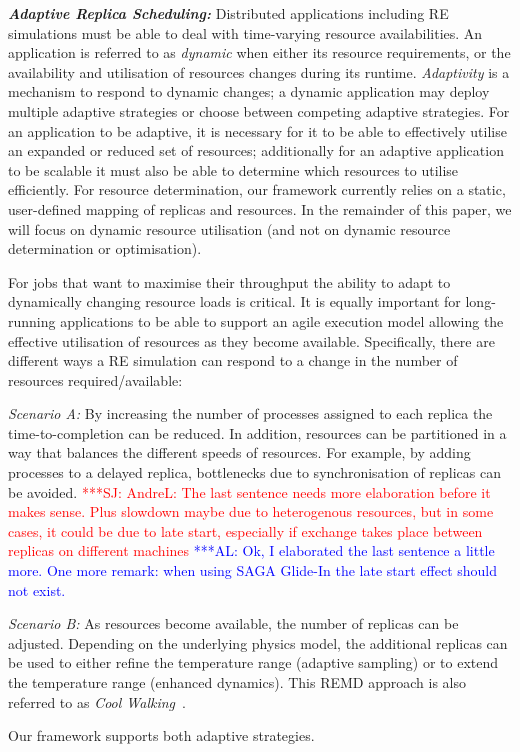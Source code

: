 \documentclass{rspublic}
\newcommand{\alnote}[1]{ {\textcolor{blue} { ***AL: #1 }}}
\newcommand{\jhanote}[1]{ {\textcolor{red} { ***SJ: #1 }}}
\newcommand{\alnote}[1]{}
\newcommand{\jhanote}[1]{}
\begin{document}
{\noindent \it \bf Adaptive Replica Scheduling:} Distributed applications
including RE simulations must be able to deal with time-varying
resource availabilities.  An application is referred to as
\emph{dynamic} when either its resource requirements, 
or the availability and utilisation of resources 
changes during its runtime.  \emph{Adaptivity} is a
mechanism to respond to dynamic
changes; %
a dynamic application may deploy multiple adaptive strategies or
choose between competing adaptive strategies.  For an application to
be adaptive, it is necessary for it to be able to effectively
utilise an expanded or reduced set of resources; additionally for an
adaptive application to be scalable it must also be able to
determine which resources to utilise efficiently.
For resource determination, our framework currently relies on a
static, user-defined mapping of replicas and resources.  In the
remainder of this paper, we will focus on dynamic resource
utilisation (and not on dynamic resource determination or
optimisation).

For jobs that want to maximise their throughput the ability to adapt
to dynamically changing resource loads is critical. 
It is equally important for long-running applications to be
able to support an agile execution model allowing the effective
utilisation of resources as they become available.  Specifically,
there are different ways a RE simulation can respond to a change in
the number of resources required/available:
\begin{compactitem}         
\item {\it Scenario A:} By increasing the number of processes assigned
  to each replica the time-to-completion can be reduced. In addition,
  resources can be partitioned in a way that balances the different
  speeds of resources.  For example, by adding processes to a 
  delayed replica, bottlenecks due to synchronisation of replicas can
  be avoided.
  \jhanote{AndreL: The last sentence needs more elaboration before it
    makes sense. Plus slowdown maybe due to heterogenous resources,
    but in some cases, it could be due to late start, especially if
    exchange takes place between replicas on different machines}
  \alnote{Ok, I elaborated the last sentence a little more. One more
    remark: when using SAGA Glide-In the late start effect should not
    exist.}

\item {\it Scenario B:} As resources become available, the
  number of replicas can be adjusted. Depending on the underlying
  physics model, the additional replicas can be used to either refine
  the temperature range (adaptive sampling) or to extend the
  temperature range (enhanced dynamics). This REMD approach is also
  referred to as \emph{Cool Walking}~\citep{coolwalking}.
\end{compactitem}           
Our framework supports both adaptive strategies.
\end{document}
